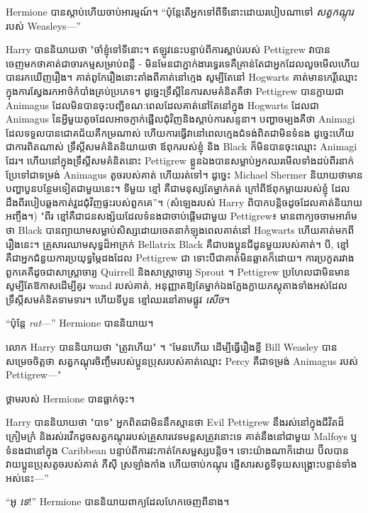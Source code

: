 {Hermione បានស្តាប់ហើយចាប់អារម្មណ៍។ “ប៉ុន្តែតើអ្នកទៅពីទីនោះដោយរបៀបណាទៅ \emph{សត្វកណ្តុរ} របស់ Weasleys—”

Harry បាននិយាយថា "ចាំខ្ញុំទៅទីនោះ។ ឥឡូវនេះបន្ទាប់ពីការស្លាប់របស់ Pettigrew វាបានចេញមកថាគាត់ជាចារកម្មសម្រាប់ពន្លឺ - មិនមែនជាភ្នាក់ងារទ្វេរទេគឺគ្រាន់តែជាអ្នកដែលលួចមើលហើយបានរកឃើញរឿង។ គាត់ពូកែរឿងនោះតាំងពីគាត់នៅក្មេង សូម្បីតែនៅ Hogwarts គាត់មានកេរ្តិ៍ឈ្មោះក្នុងការស្វែងរកអាថ៌កំបាំងគ្រប់ប្រភេទ។ ដូច្នេះទ្រឹស្តីនៃការសមគំនិតគឺថា Pettigrew បានក្លាយជា Animagus ដែលមិនបានចុះបញ្ជីខណៈពេលដែលគាត់នៅតែនៅក្នុង Hogwarts ដែលជា Animagus នៃអ្វីមួយតូចដែលអាចភ្ញាក់ផ្អើលជុំវិញនិងស្តាប់ការសន្ទនា។ បញ្ហាចម្បងគឺថា Animagi ដែលទទួលបានជោគជ័យគឺកម្រណាស់ ហើយការធ្វើវានៅពេលក្មេងជំទង់ពិតជាមិនទំនង ដូច្នេះហើយជាការពិតណាស់ ទ្រឹស្ដីសមគំនិតនិយាយថា ឪពុករបស់ខ្ញុំ និង Black ក៏មិនបានចុះឈ្មោះ Animagi ដែរ។ ហើយនៅក្នុងទ្រឹស្ដីសមគំនិតនោះ Pettigrew ខ្លួនឯងបានសម្លាប់អ្នកឈរមើលទាំងដប់ពីរនាក់ ប្រែទៅជាទម្រង់ Animagus តូចរបស់គាត់ ហើយរត់ទៅ។ ដូច្នេះ Michael Shermer និយាយថាមានបញ្ហាបួនបន្ថែមទៀតជាមួយនេះ។ ទីមួយ ខ្មៅ គឺជាមនុស្សតែម្នាក់គត់ ក្រៅពីឪពុកម្តាយរបស់ខ្ញុំ ដែលដឹងពីរបៀបឆ្លងកាត់វួដជុំវិញផ្ទះរបស់ពួកគេ”។ (សំឡេងរបស់ Harry ពិបាកបន្តិចដូចដែលគាត់និយាយអញ្ចឹង។) "ពីរ ខ្មៅគឺជាជនសង្ស័យដែលទំនងជាចាប់ផ្តើមជាមួយ Pettigrew៖ មានពាក្យចចាមអារ៉ាមថា Black បានព្យាយាមសម្លាប់សិស្សដោយចេតនាកំឡុងពេលគាត់នៅ Hogwarts ហើយគាត់មកពីរឿងនេះ។ គ្រួសារឈាមសុទ្ធដ៏អាក្រក់ Bellatrix Black គឺជាបងប្អូនជីដូនមួយរបស់គាត់។ បី, ខ្មៅគឺជាអ្នកជំនួយការប្រយុទ្ធម្ភៃដងដែល Pettigrew ជា ទោះបីជាគាត់មិនឆ្លាតក៏ដោយ។ ការ​ប្រកួត​រវាង​ពួក​គេ​គឺ​ដូច​ជា​សាស្ត្រាចារ្យ Quirrell និង​សាស្ត្រាចារ្យ Sprout ។ Pettigrew ប្រហែលជាមិនមានសូម្បីតែឱកាសដើម្បីគូរ wand របស់គាត់, អនុញ្ញាតឱ្យតែម្នាក់ឯងក្លែងក្លាយភស្តុតាងទាំងអស់ដែលទ្រឹស្តីសមគំនិតទាមទារ។ ហើយទីបួន ខ្មៅឈរនៅតាមផ្លូវ \emph{សើច}។

“ប៉ុន្តែ \emph{rat}—” Hermione បាននិយាយ។

លោក Harry បាននិយាយថា "ត្រូវហើយ" ។ "មែនហើយ ដើម្បីធ្វើរឿងខ្លី Bill Weasley បានសម្រេចចិត្តថា សត្វកណ្តុរចិញ្ចឹមរបស់ប្អូនប្រុសរបស់គាត់ឈ្មោះ Percy គឺជាទម្រង់ Animagus របស់ Pettigrew—"

ថ្គាមរបស់ Hermione បានធ្លាក់ចុះ។

Harry បាននិយាយថា "បាទ" អ្នកពិតជាមិននឹកស្មានថា Evil Pettigrew នឹងរស់នៅក្នុងជីវិតដ៏ក្រៀមក្រំ និងរស់រវើកដូចសត្វកណ្ដុររបស់គ្រួសារវេទមន្តសត្រូវនោះទេ គាត់នឹងនៅជាមួយ Malfoys ឬទំនងជានៅក្នុង Caribbean បន្ទាប់ពីការវះកាត់កែសម្ផស្សបន្តិច។ ទោះយ៉ាងណាក៏ដោយ ប៊ីលបានវាយប្អូនប្រុសតូចរបស់គាត់ ភឺស៊ី ស្រឡាំងកាំង ហើយចាប់កណ្តុរ ផ្ញើសារសត្វទីទុយសង្គ្រោះបន្ទាន់ទាំងអស់នេះ—”

“អូ \emph{ទេ}!” Hermione បាននិយាយពាក្យដែលហែកចេញពីនាង។

}
